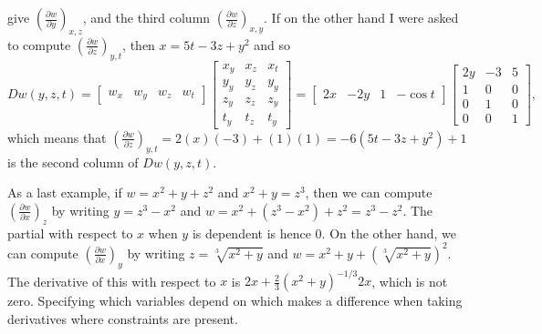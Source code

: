 give $\displaystyle\left(\frac{\partial w}{\partial y}\right)_{x,z}$, and the third
column $\displaystyle\left(\frac{\partial w}{\partial z}\right)_{x,y}$. If on the
other hand I were asked to compute
$\displaystyle\left(\frac{\partial w}{\partial z}\right)_{y,t}$, then $x=5t-3z+y^2$
and so 
$$Dw(y,z,t)=\begin{bmatrix}w_x&w_y&w_z&w_t\end{bmatrix}\begin{bmatrix}x_y&x_z&x_t\\y_y&y_z&y_y\\z_y&z_z&z_y\\t_y&t_z&t_y\end{bmatrix}
= \begin{bmatrix}2x&-2y&1&-\cos
t\end{bmatrix}\begin{bmatrix}2y&-3&5\\1&0&0\\0&1&0\\0&0&1\end{bmatrix},$$
which means that $\displaystyle\left(\frac{\partial w}{\partial z}\right)_{y,t}=
2(x)(-3)+(1)(1)= -6(5t-3z+y^2)+1$ is the second column of $Dw(y,z,t)$. 

As a last example, if $w=x^2+y+z^2$ and $x^2+y=z^3$, then we can
compute $\displaystyle\left(\frac{\partial w}{\partial x}\right)_{z}$ by writing
$y=z^3-x^2$ and $w=x^2+(z^3-x^2)+z^2 = z^3-z^2$.  The partial with
respect to $x$ when $y$ is dependent is hence 0.  On the other hand,
we can compute $\displaystyle\left(\frac{\partial w}{\partial x}\right)_{y}$ by
writing $z=\sqrt[3]{x^2+y}$ and $w=x^2+y+(\sqrt[3]{x^2+y})^2$. The
derivative of this with respect to $x$ is
$2x+\frac{2}{3}(x^2+y)^{-1/3}2x $, which is not zero. Specifying which
variables depend on which makes a difference when taking derivatives
where constraints are present.









